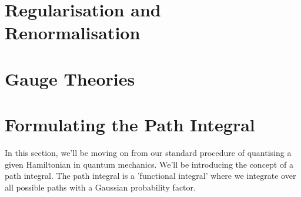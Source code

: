 \documentclass[11pt, oneside]{article}   	%
\theoremstyle{slanted}
\begin{document}
\section{Regularisation and Renormalisation}%
\label{sec:regularisation_and_renormalisation}

\section{Gauge Theories}%
\label{sec:gauge_theories}


\section{Formulating the Path Integral} 

In this section, we'll be moving on from 
our standard procedure of quantising a given Hamiltonian 
in quantum mechanics. We'll be introducing 
the concept of a path integral. The path integral 
is a 'functional integral' where we integrate over 
all possible paths with a Gaussian probability factor.
\end{document}
